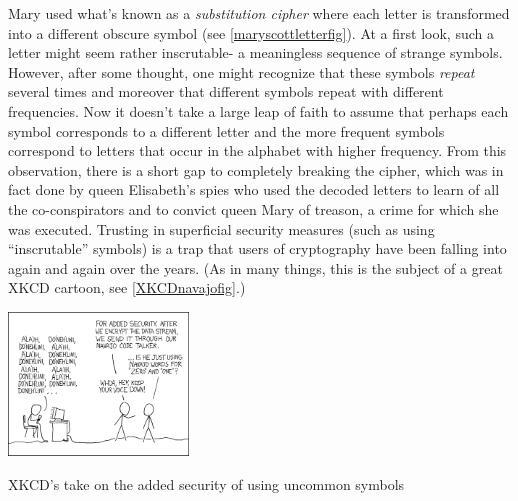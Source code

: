 Mary used what's known as a \emph{substitution cipher} where each letter
is transformed into a different obscure symbol (see
\cref{maryscottletterfig}). At a first look, such a letter might seem
rather inscrutable- a meaningless sequence of strange symbols. However,
after some thought, one might recognize that these symbols \emph{repeat}
several times and moreover that different symbols repeat with different
frequencies. Now it doesn't take a large leap of faith to assume that
perhaps each symbol corresponds to a different letter and the more
frequent symbols correspond to letters that occur in the alphabet with
higher frequency. From this observation, there is a short gap to
completely breaking the cipher, which was in fact done by queen
Elisabeth's spies who used the decoded letters to learn of all the
co-conspirators and to convict queen Mary of treason, a crime for which
she was executed. Trusting in superficial security measures (such as
using ``inscrutable'' symbols) is a trap that users of cryptography have
been falling into again and again over the years. (As in many things,
this is the subject of a great XKCD cartoon, see \cref{XKCDnavajofig}.)


\begin{marginfigure}
\centering
\includegraphics[width=\linewidth, height=1.5in, keepaspectratio]{../figure/code_talkers.png}
\caption{XKCD's take on the added security of using uncommon symbols}
\label{XKCDnavajofig}
\end{marginfigure}

